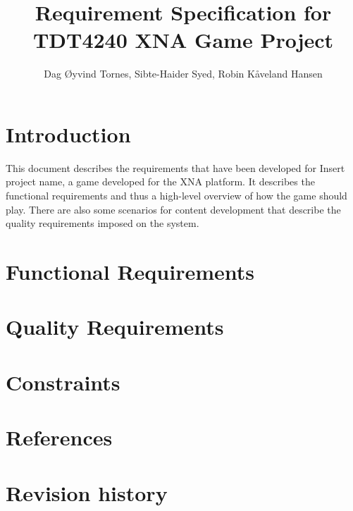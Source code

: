 \documentclass[a4paper,11pt]{article}
\author{Dag Øyvind Tornes, Sibte-Haider Syed, Robin Kåveland Hansen}
\title{Requirement Specification for TDT4240 XNA Game Project}
\def \project {Insert project name}
\begin{document}
\maketitle

\clearpage


\tableofcontents

\section{Introduction}
This document describes the requirements that have been developed for \project,
a game developed for the XNA platform. It describes the functional requirements
and thus a high-level overview of how the game should play. There are also some
scenarios for content development that describe the quality requirements imposed
on the system.

\section{Functional Requirements}

\section{Quality Requirements}

\section{Constraints}

\section{References}


\section{Revision history}
\end{document}
